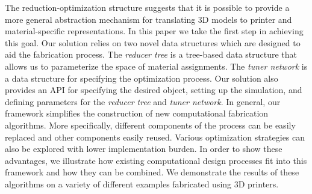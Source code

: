 The reduction-optimization structure suggests that it is possible to provide a more general abstraction mechanism for translating 3D models to printer and material-specific representations. In this paper we take the first step in achieving this goal. Our solution relies on two novel data structures which are designed to aid the fabrication process. The \emph{reducer tree} is a tree-based data structure that allows us to parameterize the space of material assignments. The \emph{tuner network} is a data structure for specifying the optimization process. Our solution also provides an API for specifying the desired object, setting up the simulation, and defining parameters for the \emph{reducer tree} and \emph{tuner network}. In general, our framework simplifies the construction of new computational fabrication algorithms. More specifically, different components of the process can be easily replaced and other components easily reused. Various optimization strategies can also be explored with lower implementation burden. In order to show these advantages, we illustrate how existing computational design processes fit into this framework and how they can be combined. We demonstrate the results of these algorithms on a variety of different examples fabricated using 3D printers.

